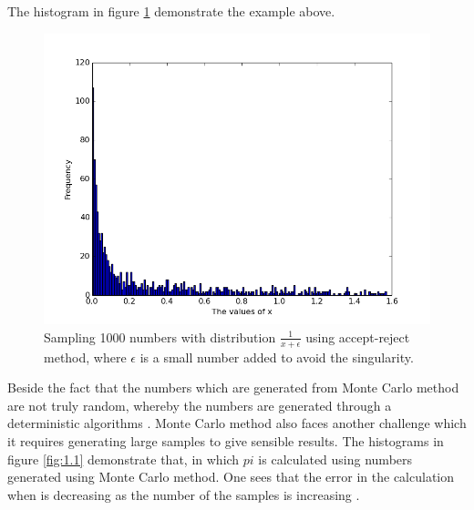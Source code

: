 The histogram in figure \ref{fig:2} demonstrate the example above. 

\begin{figure}[hbtp]
\centering
\includegraphics[scale=.5]{images/inverse_method.png}
\caption{Sampling 1000 numbers with distribution $\frac{1}{x+\epsilon}$ using accept-reject method, where $\epsilon$ is a small number added to avoid the singularity.}\label{fig:2}
\end{figure}

Beside the fact that the numbers which are generated from Monte Carlo method  are not truly random, whereby the numbers are generated through a deterministic algorithms  \citep{montecarlo}. Monte Carlo method also faces another challenge which it requires generating large samples to give sensible results. The histograms in figure \ref{fig:1.1} demonstrate that, in which $pi$ is calculated using numbers generated using Monte Carlo method.    
One sees that the error in the calculation when is decreasing as the number of the samples is increasing .

 






